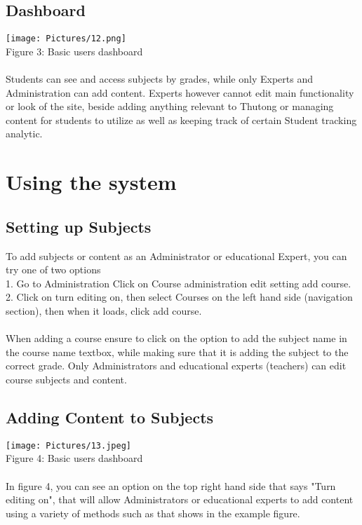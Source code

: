 \documentclass[english]{article}
\begin{document}
		\subsection{Dashboard}
\texttt{[image: Pictures/12.png]} \\
Figure 3: Basic users dashboard \\\\
Students can see and access subjects by grades, while only Experts and Administration can add content.
Experts however cannot edit main functionality or look of the site, beside adding anything relevant to Thutong or managing content for students to utilize as well as keeping track of certain Student tracking analytic.


\section{Using the system}



		\subsection{Setting up Subjects}
To add subjects or content as an Administrator or educational Expert, you can try one of two options \\
1. Go to Administration \textrightarrow  Click on Course administration \textrightarrow edit setting \textrightarrow add course.\\
2. Click on turn editing on, then select Courses on the left hand side (navigation section), then when it loads, click add course.\\\\
When adding a course ensure to click on the option to add the subject name in the course name textbox, while making sure that it is adding the subject to the correct grade.
Only Administrators and educational experts (teachers) can edit course subjects and content.

		\subsection{Adding Content to Subjects}
\texttt{[image: Pictures/13.jpeg]} \\
Figure 4: Basic users dashboard \\\\
In figure 4, you can see an option on the top right hand side that says "Turn editing on", that will allow Administrators or educational experts to add content using a variety of methods such as that shows in the example figure. 
\end{document}
